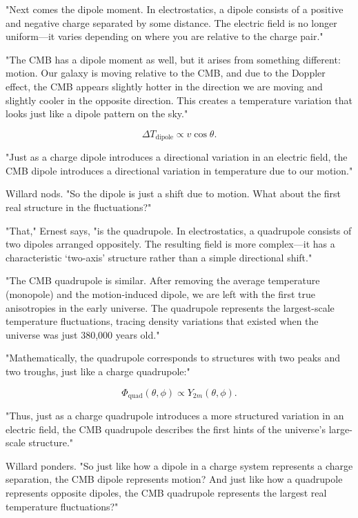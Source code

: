 "Next comes the dipole moment. In electrostatics, a dipole consists of a positive and negative charge separated by some distance. The electric field is no longer uniform—it varies depending on where you are relative to the charge pair."

"The CMB has a dipole moment as well, but it arises from something different: motion. Our galaxy is moving relative to the CMB, and due to the Doppler effect, the CMB appears slightly hotter in the direction we are moving and slightly cooler in the opposite direction. This creates a temperature variation that looks just like a dipole pattern on the sky."

\begin{equation}
\Delta T_{\text{dipole}} \propto v \cos\theta.
\end{equation}

"Just as a charge dipole introduces a directional variation in an electric field, the CMB dipole introduces a directional variation in temperature due to our motion."

Willard nods. "So the dipole is just a shift due to motion. What about the first real structure in the fluctuations?"

"That," Ernest says, "is the quadrupole. In electrostatics, a quadrupole consists of two dipoles arranged oppositely. The resulting field is more complex—it has a characteristic ‘two-axis’ structure rather than a simple directional shift."

"The CMB quadrupole is similar. After removing the average temperature (monopole) and the motion-induced dipole, we are left with the first true anisotropies in the early universe. The quadrupole represents the largest-scale temperature fluctuations, tracing density variations that existed when the universe was just 380,000 years old."

"Mathematically, the quadrupole corresponds to structures with two peaks and two troughs, just like a charge quadrupole:"

\begin{equation}
\Phi_{\text{quad}}(\theta, \phi) \propto Y_{2m}(\theta, \phi).
\end{equation}

"Thus, just as a charge quadrupole introduces a more structured variation in an electric field, the CMB quadrupole describes the first hints of the universe’s large-scale structure."

Willard ponders. "So just like how a dipole in a charge system represents a charge separation, the CMB dipole represents motion? And just like how a quadrupole represents opposite dipoles, the CMB quadrupole represents the largest real temperature fluctuations?"


